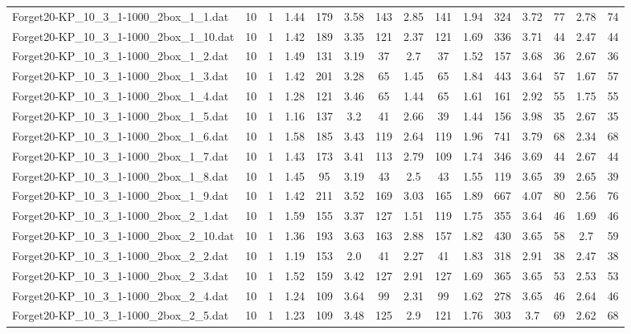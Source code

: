 \begin{table}[!ht]
{\begin{tabular}{lcccccccccccccc}
Forget20-KP\_10\_3\_1-1000\_2box\_1\_1.dat & 10 & 1 & 1.44 & 179 & 3.58 & 143 & 2.85 & 141 & 1.94 & 324 & 3.72 & 77 & 2.78 & 74 \\
Forget20-KP\_10\_3\_1-1000\_2box\_1\_10.dat & 10 & 1 & 1.42 & 189 & 3.35 & 121 & 2.37 & 121 & 1.69 & 336 & 3.71 & 44 & 2.47 & 44 \\
Forget20-KP\_10\_3\_1-1000\_2box\_1\_2.dat & 10 & 1 & 1.49 & 131 & 3.19 & 37 & 2.7 & 37 & 1.52 & 157 & 3.68 & 36 & 2.67 & 36 \\
Forget20-KP\_10\_3\_1-1000\_2box\_1\_3.dat & 10 & 1 & 1.42 & 201 & 3.28 & 65 & 1.45 & 65 & 1.84 & 443 & 3.64 & 57 & 1.67 & 57 \\
Forget20-KP\_10\_3\_1-1000\_2box\_1\_4.dat & 10 & 1 & 1.28 & 121 & 3.46 & 65 & 1.44 & 65 & 1.61 & 161 & 2.92 & 55 & 1.75 & 55 \\
Forget20-KP\_10\_3\_1-1000\_2box\_1\_5.dat & 10 & 1 & 1.16 & 137 & 3.2 & 41 & 2.66 & 39 & 1.44 & 156 & 3.98 & 35 & 2.67 & 35 \\
Forget20-KP\_10\_3\_1-1000\_2box\_1\_6.dat & 10 & 1 & 1.58 & 185 & 3.43 & 119 & 2.64 & 119 & 1.96 & 741 & 3.79 & 68 & 2.34 & 68 \\
Forget20-KP\_10\_3\_1-1000\_2box\_1\_7.dat & 10 & 1 & 1.43 & 173 & 3.41 & 113 & 2.79 & 109 & 1.74 & 346 & 3.69 & 44 & 2.67 & 44 \\
Forget20-KP\_10\_3\_1-1000\_2box\_1\_8.dat & 10 & 1 & 1.45 & 95 & 3.19 & 43 & 2.5 & 43 & 1.55 & 119 & 3.65 & 39 & 2.65 & 39 \\
Forget20-KP\_10\_3\_1-1000\_2box\_1\_9.dat & 10 & 1 & 1.42 & 211 & 3.52 & 169 & 3.03 & 165 & 1.89 & 667 & 4.07 & 80 & 2.56 & 76 \\
Forget20-KP\_10\_3\_1-1000\_2box\_2\_1.dat & 10 & 1 & 1.59 & 155 & 3.37 & 127 & 1.51 & 119 & 1.75 & 355 & 3.64 & 46 & 1.69 & 46 \\
Forget20-KP\_10\_3\_1-1000\_2box\_2\_10.dat & 10 & 1 & 1.36 & 193 & 3.63 & 163 & 2.88 & 157 & 1.82 & 430 & 3.65 & 58 & 2.7 & 59 \\
Forget20-KP\_10\_3\_1-1000\_2box\_2\_2.dat & 10 & 1 & 1.19 & 153 & 2.0 & 41 & 2.27 & 41 & 1.83 & 318 & 2.91 & 38 & 2.47 & 38 \\
Forget20-KP\_10\_3\_1-1000\_2box\_2\_3.dat & 10 & 1 & 1.52 & 159 & 3.42 & 127 & 2.91 & 127 & 1.69 & 365 & 3.65 & 53 & 2.53 & 53 \\
Forget20-KP\_10\_3\_1-1000\_2box\_2\_4.dat & 10 & 1 & 1.24 & 109 & 3.64 & 99 & 2.31 & 99 & 1.62 & 278 & 3.65 & 46 & 2.64 & 46 \\
Forget20-KP\_10\_3\_1-1000\_2box\_2\_5.dat & 10 & 1 & 1.23 & 109 & 3.48 & 125 & 2.9 & 121 & 1.76 & 303 & 3.7 & 69 & 2.62 & 68 \\

\end{tabular}}
\end{table}
